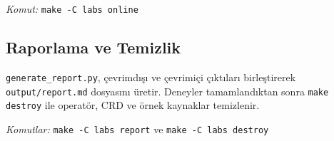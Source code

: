 \noindent \textit{Komut:} \texttt{make -C labs online}

\subsection{Raporlama ve Temizlik}

\texttt{generate\_report.py}, çevrimdışı ve çevrimiçi çıktıları birleştirerek \texttt{output/report.md} dosyasını üretir. Deneyler tamamlandıktan sonra \texttt{make destroy} ile operatör, CRD ve örnek kaynaklar temizlenir.

\noindent \textit{Komutlar:} \texttt{make -C labs report} ve \texttt{make -C labs destroy}
